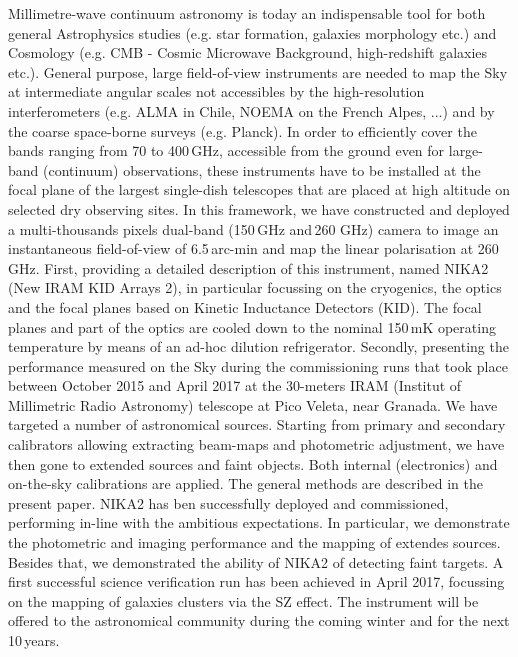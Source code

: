 \documentclass[]{aa} %
\begin{document}
  \abstract
   {Millimetre-wave continuum astronomy is today an indispensable tool for both general Astrophysics studies (e.g. star formation, galaxies morphology etc.) and Cosmology (e.g. CMB - Cosmic Microwave Background, high-redshift galaxies etc.). General purpose, large field-of-view instruments are needed to map the Sky at intermediate angular scales not accessibles by the high-resolution interferometers (e.g. ALMA in Chile, NOEMA on the French Alpes, ...) and by the coarse space-borne surveys (e.g. Planck). In order to efficiently cover the bands ranging from 70 to 400\,GHz, accessible from the ground even for large-band (continuum) observations, these instruments have to be installed at the focal plane of the largest single-dish telescopes that are placed at high altitude on selected dry observing sites. In this framework, we have constructed and deployed a multi-thousands pixels dual-band (150\,GHz and\,260 GHz) camera to image an instantaneous field-of-view of 6.5\,arc-min and map the linear polarisation at 260\,GHz.}
   {First, providing a detailed description of this instrument, named NIKA2 (New IRAM KID Arrays 2), in particular focussing on the cryogenics, the optics  and the focal planes based on Kinetic Inductance Detectors (KID). The focal planes and part of the optics are cooled down to the nominal 150\,mK operating temperature by means of an ad-hoc dilution refrigerator. 
Secondly, presenting the performance measured on the Sky during the commissioning runs that took place between October 2015 and April 2017 at the 30-meters IRAM (Institut of Millimetric Radio Astronomy) telescope at Pico Veleta, near Granada.}
   {We have targeted a number of astronomical sources. Starting from primary and secondary calibrators allowing extracting beam-maps and photometric adjustment, we have then gone to extended sources and faint objects. Both internal (electronics) and on-the-sky calibrations are applied. The general methods are described in the present paper.}
   {NIKA2 has ben successfully deployed and commissioned, performing in-line with the ambitious expectations. In particular, we demonstrate the photometric and imaging performance and the mapping of extendes sources. Besides that, we demonstrated the ability of NIKA2 of detecting faint targets. A first successful science verification run has been achieved in April 2017, focussing on the mapping of galaxies clusters via the SZ effect. The instrument will be offered to the astronomical community during the coming winter and for the next 10\,years.}
   {}
\end{document}
